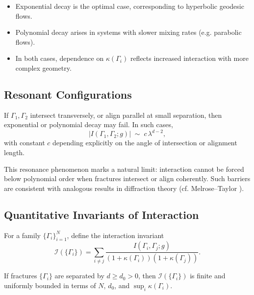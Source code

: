 \begin{remark}[Interpretation]
\begin{itemize}
  \item Exponential decay is the optimal case, corresponding to hyperbolic geodesic flows. 
  \item Polynomial decay arises in systems with slower mixing rates (e.g. parabolic flows). 
  \item In both cases, dependence on $\kappa(\Gamma_i)$ reflects increased interaction with more complex geometry. 
\end{itemize}
\end{remark}

\subsection{Resonant Configurations}

\begin{theorem}
\label{thm:resonance-barrier}
If $\Gamma_1,\Gamma_2$ intersect transversely, or align parallel at small separation, then exponential or polynomial decay may fail. 
In such cases,
\[
|I(\Gamma_1,\Gamma_2;g)| \;\sim\; c\,\lambda^{d-2},
\]
with constant $c$ depending explicitly on the angle of intersection or alignment length. 
\end{theorem}

\begin{remark}
This resonance phenomenon marks a natural limit: interaction cannot be forced below polynomial order when fractures intersect or align coherently. 
Such barriers are consistent with analogous results in diffraction theory (cf. Melrose--Taylor \cite{MelroseTaylor1985}). 
\end{remark}

\subsection{Quantitative Invariants of Interaction}

\begin{definition}
\label{def:interaction-invariant}
For a family $\{\Gamma_i\}_{i=1}^N$, define the interaction invariant
\[
\mathcal{I}(\{\Gamma_i\})
=
\sum_{i\neq j}
\frac{I(\Gamma_i,\Gamma_j;g)}
{(1+\kappa(\Gamma_i))(1+\kappa(\Gamma_j))}.
\]
\end{definition}

\begin{proposition}
\label{prop:interaction-boundedness}
If fractures $\{\Gamma_i\}$ are separated by $d\geq d_0>0$, then $\mathcal{I}(\{\Gamma_i\})$ is finite and uniformly bounded in terms of $N$, $d_0$, and $\sup_i\kappa(\Gamma_i)$. 
\end{proposition}

